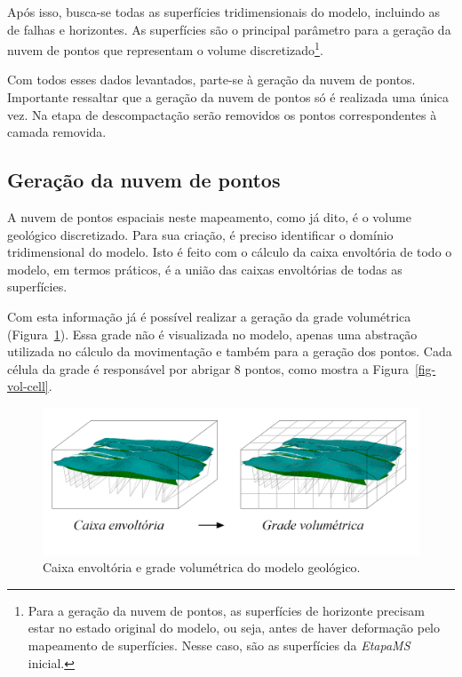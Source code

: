 Após isso, busca-se todas as superfícies tridimensionais do modelo, incluindo as de falhas e horizontes. As superfícies são o principal parâmetro para a geração da nuvem de pontos que representam o volume discretizado\footnote{Para a geração da nuvem de pontos, as superfícies de horizonte precisam estar no estado original do modelo, ou seja, antes de haver deformação pelo mapeamento de superfícies. Nesse caso, são as superfícies da \emph{EtapaMS} inicial.}.

Com todos esses dados levantados, parte-se à geração da nuvem de pontos. Importante ressaltar que a geração da nuvem de pontos só é realizada uma única vez. Na etapa de descompactação serão removidos os pontos correspondentes à camada removida.

\subsection{Geração da nuvem de pontos}\label{cloud-points-generation}

A nuvem de pontos espaciais neste mapeamento, como já dito, é o volume geológico discretizado. Para sua criação, é preciso identificar o domínio tridimensional do modelo. Isto é feito com o cálculo da caixa envoltória de todo o modelo, em termos práticos, é a união das caixas envoltórias de todas as superfícies.

Com esta informação já é possível realizar a geração da grade volumétrica (Figura~\ref{fig-vol-grid}). Essa grade não é visualizada no modelo, apenas uma abstração utilizada no cálculo da movimentação e também para a geração dos pontos. Cada célula da grade é responsável por abrigar 8 pontos, como mostra a Figura~\ref{fig-vol-cell}.

\begin{figure} [H]
  \begin{center}
    \includegraphics[width=\textwidth]{images/fig-vol-grid}
    \caption{Caixa envoltória e grade volumétrica do modelo geológico.}\label{fig-vol-grid}
  \end{center}
\end{figure}

